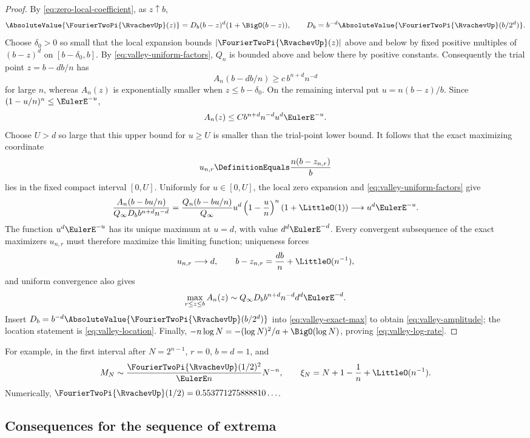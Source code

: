 \documentclass[11pt,oneside]{article}
\numberwithin{equation}{section}
\theoremstyle{definition}
\theoremstyle{remark}
\begin{document}
\begin{proof}
By \eqref{eq:zero-local-coefficient}, as $z\uparrow b$,
\[
 \AbsoluteValue{\FourierTwoPi{\RvachevUp}(z)}
 =D_b(b-z)^d(1+\BigO(b-z)),
 \qquad
 D_b=b^{-d}\AbsoluteValue{\FourierTwoPi{\RvachevUp}(b/2^d)}.
\]
Choose $\delta_0>0$ so small that the local expansion bounds
$|\FourierTwoPi{\RvachevUp}(z)|$ above and below by fixed positive multiples of $(b-z)^d$ on
$[b-\delta_0,b]$.  By \eqref{eq:valley-uniform-factors}, $Q_n$ is bounded above
and below there by positive constants.  Consequently the trial point $z=b-db/n$
has
\[
 A_n(b-db/n)\ge c\,b^{n+d}n^{-d}
\]
for large $n$, whereas $A_n(z)$ is exponentially smaller when
$z\le b-\delta_0$.  On the remaining interval put $u=n(b-z)/b$.  Since
$(1-u/n)^n\le \EulerE^{-u}$,
\[
 A_n(z)\le C b^{n+d}n^{-d}u^d\EulerE^{-u}.
\]
Choose $U>d$ so large that this upper bound for $u\ge U$ is smaller than the
trial-point lower bound.  It follows that the exact maximizing coordinate
\[
 u_{n,r}\DefinitionEquals\frac{n(b-z_{n,r})}{b}
\]
lies in the fixed compact interval $[0,U]$.  Uniformly for $u\in[0,U]$, the local
zero expansion and \eqref{eq:valley-uniform-factors} give
\[
 \frac{A_n(b-bu/n)}{Q_\infty D_b b^{n+d}n^{-d}}
 =\frac{Q_n(b-bu/n)}{Q_\infty}
   u^d\left(1-\frac un\right)^n(1+\LittleO(1))
 \longrightarrow u^d\EulerE^{-u}.
\]
The function $u^d\EulerE^{-u}$ has its unique maximum at $u=d$, with value $d^d\EulerE^{-d}$.
Every convergent subsequence of the exact maximizers $u_{n,r}$ must therefore maximize
this limiting function; uniqueness forces
\[
 u_{n,r}\longrightarrow d,
 \qquad
 b-z_{n,r}=\frac{db}{n}+\LittleO(n^{-1}),
\]
and uniform convergence also gives
\[
 \max_{r\le z\le b}A_n(z)
 \sim Q_\infty D_b b^{n+d}n^{-d}d^d\EulerE^{-d}.
\]
Insert $D_b=b^{-d}\AbsoluteValue{\FourierTwoPi{\RvachevUp}(b/2^d)}$ into
\eqref{eq:valley-exact-max} to obtain \eqref{eq:valley-amplitude}; the location statement
is \eqref{eq:valley-location}.  Finally,
$-n\log N=-(\log N)^2/a+\BigO(\log N)$, proving
\eqref{eq:valley-log-rate}.
\end{proof}

For example, in the first interval after $N=2^{n-1}$, $r=0$, $b=d=1$, and
\begin{equation}
 M_N\sim\frac{\FourierTwoPi{\RvachevUp}(1/2)^2}{\EulerE n}N^{-n},
 \qquad
 \xi_N=N+1-\frac1n+\LittleO(n^{-1}).
 \label{eq:first-dyadic-valley}
\end{equation}
Numerically,
$\FourierTwoPi{\RvachevUp}(1/2)=0.553771275888810\ldots$.

\subsection{Consequences for the sequence of extrema}
\end{document}
